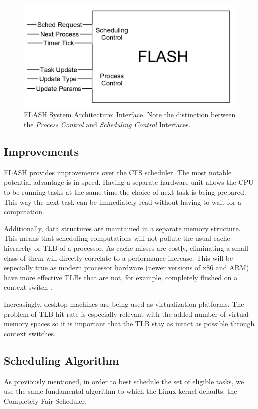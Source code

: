 \documentclass{sig-alternate-10pt}
\begin{document}
\begin{figure}
	\begin{center}
		\includegraphics[width=0.9\linewidth]{fig/flash-diagram.png}
		\caption{
			FLASH System Architecture: Interface.  Note the distinction between
			the \emph{Process Control} and \emph{Scheduling Control} Interfaces.
		}
		\label{fig:arch_overview}
	\end{center}
\end{figure}

\subsection{Improvements}
FLASH provides improvements over the CFS scheduler. The most
notable potential advantage is in speed. Having a separate hardware unit
allows the CPU to be running tasks at the same time the choice of next task
is being prepared.  This way the next task can be immediately read without having to
wait for a computation.

Additionally, data structures are maintained in a separate memory structure.  This
means that scheduling computations will not pollute the usual cache
hierarchy or TLB of a processor.  As cache misses are costly, eliminating a small class of
them will directly correlate to a performance increase.  This will be
especially true as modern processor hardware (newer versions of x86 and ARM)
have more effective TLBs that are not, for example, completely flushed on
a context switch \cite{neiger2006intel}.

Increasingly, desktop machines are being used as virtualization platforms.
The problem of TLB hit rate is especially relevant with the added number of
virtual memory spaces so it is important that the TLB stay as intact as
possible through context switches.

\subsection{Scheduling Algorithm}
As previously mentioned, in order to best schedule the set of eligible
tasks, we use the same fundamental algorithm to which the Linux kernel
defaults: the Completely Fair Scheduler.
\end{document}
